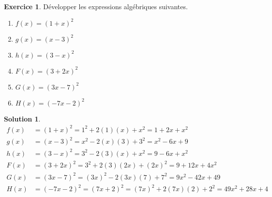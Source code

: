 \documentclass[a4paper, 14pt]{extarticle}
\theoremstyle{plain}
\newtheorem*{sol}{Solution}
\theoremstyle{definition}
\newtheorem{ex}{Exercice}
\newcommand{\exe}[2]{
		\begin{ex} #1  \end{ex}
		\begin{sol} #2 \end{sol}
	}
\newcommand{\exe}[2]{
		\begin{ex} #1  \end{ex}
	}
\begin{document}
	\exe{
		Développer les expressions algébriques suivantes.
			\begin{multicols}{2}
			\begin{enumerate}[$\bullet$]
				\item $f(x) = (1+x)^2$
				\item $g(x) = (x-3)^2$
				\item $h(x) = (3-x)^2$
				\item $F(x) = (3 + 2x)^2$
				\item $G(x) = (3x - 7)^2$
				\item $H(x) = (-7x - 2)^2$
			\end{enumerate}
			\end{multicols}
	}{
	
	
	\begin{align*}
		f(x) &= (1+x)^2 = 1^2 + 2(1)(x) + x^2 = 1 + 2x + x^2 \\
		g(x) &= (x-3)^2 = x^2 - 2(x)(3) + 3^2 = x^2 - 6x + 9 \\
		h(x) &= (3-x)^2 = 3^2 - 2(3)(x) + x^2 = 9 - 6x + x^2 \\
		F(x) &= (3 + 2x)^2 = 3^2 + 2(3)(2x) + (2x)^2 = 9 + 12x + 4x^2 \\
		G(x) &= (3x - 7)^2 = (3x)^2 - 2(3x)(7) + 7^2 = 9x^2 - 42x + 49 \\
		H(x) &= (-7x - 2)^2 = (7x + 2)^2 = (7x)^2 + 2(7x)(2) + 2^2 = 49x^2 + 28x + 4
	\end{align*}
	
	
	
	}
	
\end{document}
